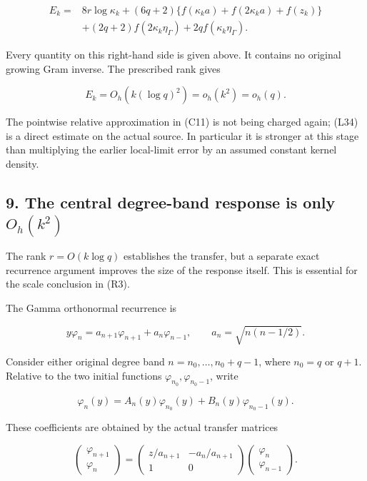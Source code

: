 \[
\boxed{\begin{aligned}
E_k={}&8r\log\kappa_k+(6q+2)
\{f(\kappa_k a)+f(2\kappa_k a)+f(z_k)\}\\
&+(2q+2)f(2\kappa_k\eta_\Gamma)
+2qf(\kappa_k\eta_\Gamma).
\end{aligned}}
\tag{L34}
\]

Every quantity on this right-hand side is given above. It contains no original growing Gram inverse. The prescribed rank gives

\[
E_k=O_h(k(\log q)^2)=o_h(k^2)=o_h(q).
\tag{L35}
\]

The pointwise relative approximation in (C11) is not being charged again; (L34) is a direct estimate on the actual source. In particular it is stronger at this stage than multiplying the earlier local-limit error by an assumed constant kernel density.

\subsection{\texorpdfstring{9. The central degree-band response is only \(O_h(k^2)\)}{9. The central degree-band response is only O\_h(k\^{}2)}}\label{the-central-degree-band-response-is-only-o_hk2}

The rank \(r=O(k\log q)\) establishes the transfer, but a separate exact recurrence argument improves the size of the response itself. This is essential for the scale conclusion in (R3).

The Gamma orthonormal recurrence is

\[
y\varphi_n=a_{n+1}\varphi_{n+1}+a_n\varphi_{n-1},\qquad
a_n=\sqrt{n(n-1/2)}.
\tag{L36}
\]

Consider either original degree band \(n=n_0,\ldots,n_0+q-1\), where \(n_0=q\) or \(q+1\). Relative to the two initial functions \(\varphi_{n_0},\varphi_{n_0-1}\), write

\[
\varphi_n(y)=A_n(y)\varphi_{n_0}(y)+B_n(y)\varphi_{n_0-1}(y).
\tag{L37}
\]

These coefficients are obtained by the actual transfer matrices

\[
\begin{pmatrix}\varphi_{n+1}\\\varphi_n\end{pmatrix}
=\begin{pmatrix}z/a_{n+1}&-a_n/a_{n+1}\\1&0\end{pmatrix}
\begin{pmatrix}\varphi_n\\\varphi_{n-1}\end{pmatrix}.
\]

